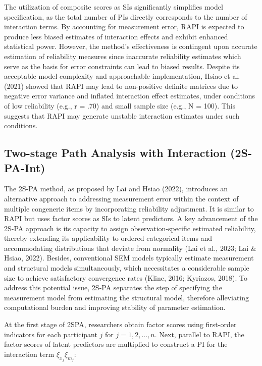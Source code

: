 \documentclass[
  man]{apa6}
\begin{document}
The utilization of composite scores as SIs significantly simplifies model specification, as the total number of PIs directly corresponds to the number of interaction terms. By accounting for measurement error, RAPI is expected to produce less biased estimates of interaction effects and exhibit enhanced statistical power. However, the method's effectiveness is contingent upon accurate estimation of reliability measures since inaccurate reliability estimates which serve as the basis for error constraints can lead to biased results. Despite its acceptable model complexity and approachable implementation, Hsiao et al. (2021) showed that RAPI may lead to non-positive definite matrices due to negative error variance and inflated interaction effect estimates, under conditions of low reliability (e.g., r = .70) and small sample size (e.g., N = 100). This suggests that RAPI may generate unstable interaction estimates under such conditions.

\hypertarget{two-stage-path-analysis-with-interaction-2s-pa-int}{%
\subsection{Two-stage Path Analysis with Interaction (2S-PA-Int)}\label{two-stage-path-analysis-with-interaction-2s-pa-int}}

The 2S-PA method, as proposed by Lai and Hsiao (2022), introduces an alternative approach to addressing measurement error within the context of multiple congeneric items by incorporating reliability adjustment. It is similar to RAPI but uses factor scores as SIs to latent predictors. A key advancement of the 2S-PA approach is its capacity to assign observation-specific estimated reliability, thereby extending its applicability to ordered categorical items and accommodating distributions that deviate from normality (Lai et al., 2023; Lai \& Hsiao, 2022). Besides, conventional SEM models typically estimate measurement and structural models simultaneously, which necessitates a considerable sample size to achieve satisfactory convergence rates (Kline, 2016; Kyriazos, 2018). To address this potential issue, 2S-PA separates the step of specifying the measurement model from estimating the structural model, therefore alleviating computational burden and improving stability of parameter estimation.

At the first stage of 2SPA, researchers obtain factor scores using first-order indicators for each participant \(j\) for \(j = 1, 2, ..., n\). Next, parallel to RAPI, the factor scores of latent predictors are multiplied to construct a PI for the interaction term \(\xi_{x_{j}}\xi_{m_{j}}\):
\end{document}
